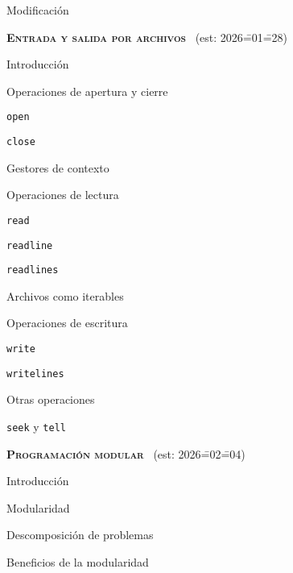 \begin{longenum}
\begin{longenum}
\begin{longenum}
            \item Modificación
        \end{longenum}
    \end{longenum}
    \item \textbf{\textsc{Entrada y salida por archivos}} \ (est: 2026\==01\==28)
    \begin{longenum}
        \item Introducción
        \item Operaciones de apertura y cierre
        \begin{longenum}
            \item \texttt{open}
            \item \texttt{close}
            \item Gestores de contexto
        \end{longenum}
        \item Operaciones de lectura
        \begin{longenum}
            \item \texttt{read}
            \item \texttt{readline}
            \item \texttt{readlines}
            \item Archivos como iterables
        \end{longenum}
        \item Operaciones de escritura
        \begin{longenum}
            \item \texttt{write}
            \item \texttt{writelines}
        \end{longenum}
        \item Otras operaciones
        \begin{longenum}
            \item \texttt{seek} y \texttt{tell}
        \end{longenum}
    \end{longenum}
    \item \textbf{\textsc{Programación modular}} \ (est: 2026\==02\==04)
    \begin{longenum}
        \item Introducción
        \begin{longenum}
            \item Modularidad
            \item Descomposición de problemas
            \item Beneficios de la modularidad

\end{longenum}
\end{longenum}
\end{longenum}
